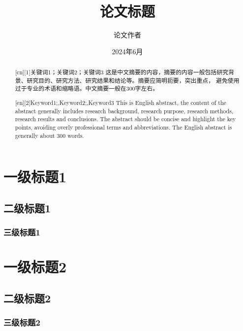 \documentclass{nefuthesis}
\title{论文标题}
\author{论文作者}
\date{2024年6月}
\begin{document}
\makecover

\begin{abstract}[cn][1]{关键词1；关键词2；关键词3}
这是中文摘要的内容，摘要的内容一般包括研究背景、研究目的、研究方法、研究结果和结论等。摘要应简明扼要，突出重点，
避免使用过于专业的术语和缩略语。中文摘要一般在300字左右。
\end{abstract}

\begin{abstract}[en][2]{Keyword1;\sep Keyword2;\sep Keyword3}
This is English abstract, the content of the abstract generally includes research background, 
research purpose, research methods, research results and conclusions. The abstract should be concise 
and highlight the key points, avoiding overly professional terms and abbreviations. The English abstract 
is generally about 300 words.
\end{abstract}

\content

\begin{thesis}

    \section{一级标题1}
    \subsection{二级标题1}
    \subsubsection{三级标题1}

    \section{一级标题2}
    \subsection{二级标题2}
    \subsubsection{三级标题2}

\end{thesis} 
\end{document}
